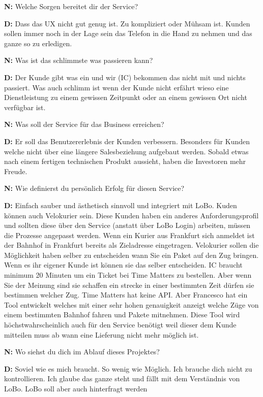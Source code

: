 \textbf{N:} Welche Sorgen bereitet dir der Service?

\textbf{D:} Dass das UX nicht gut genug ist. Zu kompliziert oder Mühsam ist. Kunden sollen immer noch in der Lage sein das Telefon in die Hand zu nehmen und das ganze so zu erledigen.

\textbf{N:} Was ist das schlimmste was passieren kann?

\textbf{D:} Der Kunde gibt was ein und wir (IC) bekommen das nicht mit und nichts passiert. Was auch schlimm ist wenn der Kunde nicht erfährt wieso eine Dienstleistung zu einem gewissen Zeitpunkt oder an einem gewissen Ort nicht verfügbar ist.

\textbf{N:} Was soll der Service für das Business erreichen?

\textbf{D:} Er soll das Benutzererlebnis der Kunden verbessern. Besonders für Kunden welche nicht über eine längere Salesbeziehung aufgebaut werden. Sobald etwas nach einem fertigen technischen Produkt aussieht, haben die Investoren mehr Freude.

\textbf{N:} Wie definierst du persönlich Erfolg für diesen Service?

\textbf{D:} Einfach sauber und ästhetisch sinnvoll und integriert mit LoBo. Kuden können auch Velokurier sein. Diese Kunden haben ein anderes Anforderungsprofil und sollten diese über den Service (anstatt über LoBo Login) arbeiten, müssen die Prozesse angepasst werden. Wenn ein Kurier aus Frankfurt sich anmeldet ist der Bahnhof in Frankfurt bereits als Zieladresse eingetragen. Velokurier sollen die Möglichkeit haben selber zu entscheiden wann Sie ein Paket auf den Zug bringen. Wenn es ihr eigener Kunde ist können sie das selber entscheiden. IC braucht minimum 20 Minuten um ein Ticket bei Time Matters zu bestellen. Aber wenn Sie der Meinung sind sie schaffen ein strecke in einer bestimmten Zeit dürfen sie bestimmen welcher Zug. Time Matters hat keine API. Aber Francesco hat ein Tool entwickelt welches mit einer sehr hohen genauigkeit anzeigt welche Züge von einem bestimmten Bahnhof fahren und Pakete mitnehmen. Diese Tool wird höchstwahrscheinlich auch für den Service benötigt weil dieser dem Kunde mitteilen muss ab wann eine Lieferung nicht mehr möglich ist.

\textbf{N:} Wo siehst du dich im Ablauf dieses Projektes?

\textbf{D:} Soviel wie es mich braucht. So wenig wie Möglich. Ich brauche dich nicht zu kontrollieren. Ich glaube das ganze steht und fällt mit dem Verständnis von LoBo. LoBo soll aber auch hinterfragt werden

